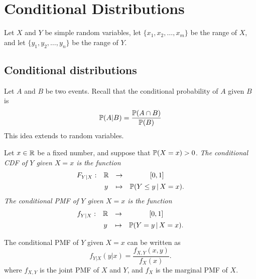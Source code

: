 \chapter{Conditional Distributions}\label{chap:cond-dist}

Let $X$ and $Y$ be simple random variables, let $\{x_1,x_2,\ldots,x_m\}$ be the range of $X$, and let $\{y_1,y_2,\ldots,y_n\}$ be the range of $Y$.

\section{Conditional distributions}
Let $A$ and $B$ be two events. Recall that the conditional probability of $A$ given $B$ is
\[
\mathbb{P}(A|B) = \frac{\mathbb{P}(A\cap B)}{\mathbb{P}(B)}
\]
This idea extends to random variables. 


\begin{definition}
Let $x\in\mathbb{R}$ be a fixed number, and suppose that $\mathbb{P}(X=x)>0$.
\ben
\it The \emph{conditional CDF} of $Y$ given $X=x$ is the function
\[
\begin{array}{cccc}
F_{Y|X}	:	& \mathbb{R}	& \to		& [0,1] \\[1ex]
			& y & \mapsto	& \mathbb{P}(Y\leq y \,|\, X=x).
\end{array}
\]
\it The \emph{conditional PMF} of $Y$ given $X=x$ is the function
\[
\begin{array}{cccc}
f_{Y|X}	:	& \mathbb{R}		& \to		& [0,1] \\[1ex]
			& y 		& \mapsto	& \mathbb{P}(Y=y \,|\, X=x).
\end{array}
\]
\een
\end{definition}


\begin{lemma}\label{lem:cond-pmf}
The conditional PMF of $Y$ given $X=x$ can be written as 
\[
f_{Y|X}(y|x) = \displaystyle \frac{f_{X,Y}(x,y)}{f_X(x)}.
\]
where $f_{X,Y}$ is the joint PMF of $X$ and $Y$, and $f_X$ is the marginal PMF of $X$.
\end{lemma}

